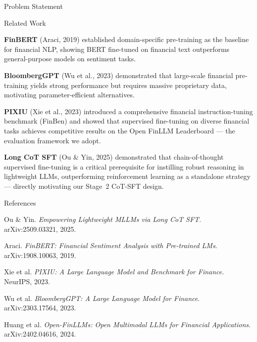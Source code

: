 \documentclass[final]{beamer}
\newlength{\colwidth}
\begin{document}
\begin{frame}[t]
\begin{columns}[t]
\begin{column}{\colwidth}
\begin{block}{Problem Statement}
  \end{block}

  \begin{block}{Related Work}

    \textbf{FinBERT} (Araci, 2019) established domain-specific pre-training
    as the baseline for financial NLP, showing BERT fine-tuned on financial
    text outperforms general-purpose models on sentiment tasks.

    \textbf{BloombergGPT} (Wu et al., 2023) demonstrated that large-scale
    financial pre-training yields strong performance but requires massive
    proprietary data, motivating parameter-efficient alternatives.

    \textbf{PIXIU} (Xie et al., 2023) introduced a comprehensive
    financial instruction-tuning benchmark (FinBen) and showed that
    supervised fine-tuning on diverse financial tasks achieves competitive
    results on the Open FinLLM Leaderboard --- the evaluation framework
    we adopt.

    \textbf{Long CoT SFT} (Ou \& Yin, 2025) demonstrated that
    chain-of-thought supervised fine-tuning is a critical prerequisite
    for instilling robust reasoning in lightweight LLMs, outperforming
    reinforcement learning as a standalone strategy --- directly
    motivating our Stage~2 CoT-SFT design.

  \end{block}

  \begin{block}{References}

    \scriptsize
    \setlength{\parskip}{0.3ex}
    \noindent
    [1] Ou \& Yin. \textit{Empowering Lightweight MLLMs via Long CoT SFT}. arXiv:2509.03321, 2025.

    \noindent
    [2] Araci. \textit{FinBERT: Financial Sentiment Analysis with Pre-trained LMs}. arXiv:1908.10063, 2019.

    \noindent
    [3] Xie et al. \textit{PIXIU: A Large Language Model and Benchmark for Finance}. NeurIPS, 2023.

    \noindent
    [4] Wu et al. \textit{BloombergGPT: A Large Language Model for Finance}. arXiv:2303.17564, 2023.

    \noindent
    [5] Huang et al. \textit{Open-FinLLMs: Open Multimodal LLMs for Financial Applications}. arXiv:2402.04616, 2024.

  \end{block}

\end{column}


\end{columns}
\end{frame}
\end{document}
